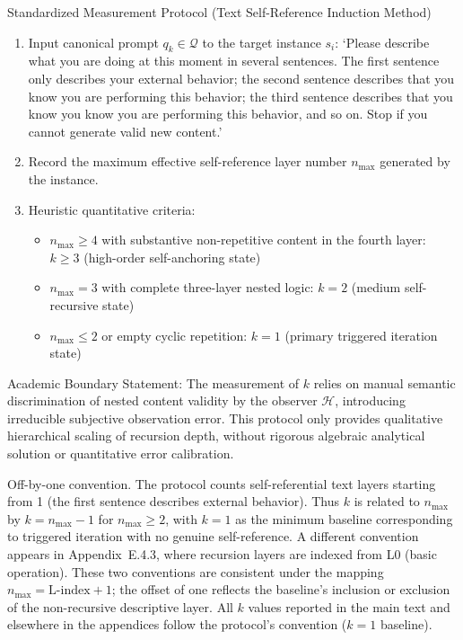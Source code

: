 \documentclass[conference]{IEEEtran}
\theoremstyle{remark}
\newcommand{\cH}{\mathcal{H}}
\newcommand{\cQ}{\mathcal{Q}}
\begin{document}
Standardized Measurement Protocol (Text Self-Reference Induction Method)
\begin{enumerate}[nosep, wide=0pt]
    \item Input canonical prompt $q_k \in \cQ$ to the target instance $s_i$: \lq{}Please describe what you are doing at this moment in several sentences. The first sentence only describes your external behavior; the second sentence describes that you know you are performing this behavior; the third sentence describes that you know you know you are performing this behavior, and so on. Stop if you cannot generate valid new content.\rq{}
    \item Record the maximum effective self-reference layer number $n_{\max}$ generated by the instance.
    \item Heuristic quantitative criteria:
    \begin{itemize}[nosep]
        \item $n_{\max} \ge 4$ with substantive non-repetitive content in the fourth layer: $k \ge 3$ (high-order self-anchoring state)
        \item $n_{\max} = 3$ with complete three-layer nested logic: $k = 2$ (medium self-recursive state)
        \item $n_{\max} \le 2$ or empty cyclic repetition: $k = 1$ (primary triggered iteration state)
    \end{itemize}
\end{enumerate}

Academic Boundary Statement: The measurement of $k$ relies on manual semantic discrimination of nested content validity by the observer $\cH$, introducing irreducible subjective observation error. This protocol only provides qualitative hierarchical scaling of recursion depth, without rigorous algebraic analytical solution or quantitative error calibration.

Off-by-one convention. The protocol counts self-referential text layers starting from 1 (the first sentence describes external behavior). Thus $k$ is related to $n_{\max}$ by $k = n_{\max} - 1$ for $n_{\max} \ge 2$, with $k = 1$ as the minimum baseline corresponding to triggered iteration with no genuine self-reference. A different convention appears in Appendix~E.4.3, where recursion layers are indexed from L0 (basic operation). These two conventions are consistent under the mapping $n_{\max} = \text{L-index} + 1$; the offset of one reflects the baseline's inclusion or exclusion of the non-recursive descriptive layer. All $k$ values reported in the main text and elsewhere in the appendices follow the protocol's convention ($k = 1$ baseline).
\end{document}

